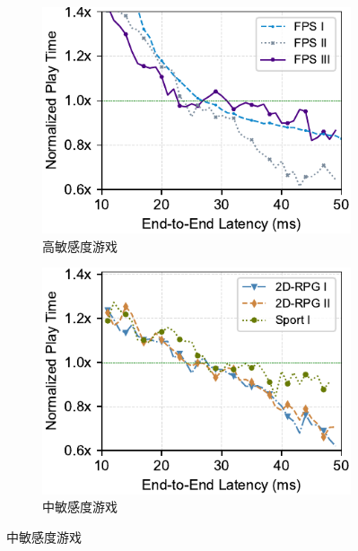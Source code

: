 \begin{figure}[htbp]
\centering
\begin{subfigure}[t]{0.4\linewidth}
  \centering
  \includegraphics[width=\linewidth]{figures/chap03/measurement_data/delay-sensitive.pdf}
  \caption{高敏感度游戏}
  \label{fig-real-measurement-results-High-Delay-Sensitivity-Games}
\end{subfigure}%
\begin{subfigure}[t]{0.4\linewidth}
  \centering
  \includegraphics[width=\linewidth]{figures/chap03/measurement_data/delay-linear-sensitive.pdf}
  \caption{中敏感度游戏}
  \label{fig-real-measurement-Medium-Delay-Sensitivity-Games}
\end{subfigure}


\end{figure}

